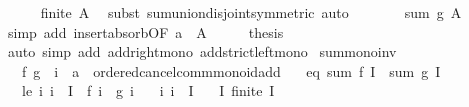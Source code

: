 \begin{isabellebody}
\ \ \ \ \isamarkupfalse%
\ {\isacartoucheopen}finite\ A{\isacartoucheclose}\ \isamarkupfalse%
\ {\isacharparenleft}{\kern0pt}subst\ sum{\isachardot}{\kern0pt}union{\isacharunderscore}{\kern0pt}disjoint{\isacharbrackleft}{\kern0pt}symmetric{\isacharbrackright}{\kern0pt}{\isacharparenright}{\kern0pt}\ auto\isanewline
\ \ \isamarkupfalse%
\ \isamarkupfalse%
\ {\isachardoublequoteopen}{\isasymdots}\ {\isacharequal}{\kern0pt}\ sum\ g\ A{\isachardoublequoteclose}\ \isamarkupfalse%
\ {\isacharparenleft}{\kern0pt}simp\ add{\isacharcolon}{\kern0pt}\ insert{\isacharunderscore}{\kern0pt}absorb{\isacharbrackleft}{\kern0pt}OF\ {\isacartoucheopen}a\ {\isasymin}\ A{\isacartoucheclose}{\isacharbrackright}{\kern0pt}{\isacharparenright}{\kern0pt}\isanewline
\ \ \isamarkupfalse%
\ \isamarkupfalse%
\ {\isacharquery}{\kern0pt}thesis\isanewline
\ \ \ \ \isamarkupfalse%
\ {\isacharparenleft}{\kern0pt}auto\ simp\ add{\isacharcolon}{\kern0pt}\ add{\isacharunderscore}{\kern0pt}right{\isacharunderscore}{\kern0pt}mono\ add{\isacharunderscore}{\kern0pt}strict{\isacharunderscore}{\kern0pt}left{\isacharunderscore}{\kern0pt}mono{\isacharparenright}{\kern0pt}\isanewline
{}\isamarkupfalse%
%
\endisatagproof
{\isafoldproof}%
%
\isadelimproof
\isanewline
%
\endisadelimproof
\isanewline
{}\isamarkupfalse%
\ sum{\isacharunderscore}{\kern0pt}mono{\isacharunderscore}{\kern0pt}inv{\isacharcolon}{\kern0pt}\isanewline
\ \ \ f\ g\ {\isacharcolon}{\kern0pt}{\isacharcolon}{\kern0pt}\ {\isachardoublequoteopen}{\isacharprime}{\kern0pt}i\ {\isasymRightarrow}\ {\isacharprime}{\kern0pt}a\ {\isacharcolon}{\kern0pt}{\isacharcolon}{\kern0pt}\ ordered{\isacharunderscore}{\kern0pt}cancel{\isacharunderscore}{\kern0pt}comm{\isacharunderscore}{\kern0pt}monoid{\isacharunderscore}{\kern0pt}add{\isachardoublequoteclose}\isanewline
\ \ \ eq{\isacharcolon}{\kern0pt}\ {\isachardoublequoteopen}sum\ f\ I\ {\isacharequal}{\kern0pt}\ sum\ g\ I{\isachardoublequoteclose}\isanewline
\ \ \ le{\isacharcolon}{\kern0pt}\ {\isachardoublequoteopen}{\isasymAnd}i{\isachardot}{\kern0pt}\ i\ {\isasymin}\ I\ {\isasymLongrightarrow}\ f\ i\ {\isasymle}\ g\ i{\isachardoublequoteclose}\isanewline
\ \ \ i{\isacharcolon}{\kern0pt}\ {\isachardoublequoteopen}i\ {\isasymin}\ I{\isachardoublequoteclose}\isanewline
\ \ \ I{\isacharcolon}{\kern0pt}\ {\isachardoublequoteopen}finite\ I{\isachardoublequoteclose}\isanewline

\end{isabellebody}
